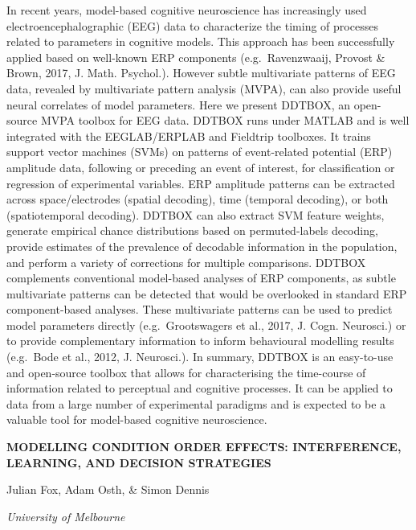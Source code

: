 \documentclass[]{article}
\begin{document}
In recent years, model-based cognitive neuroscience has increasingly
used electroencephalographic (EEG) data to characterize the timing of
processes related to parameters in cognitive models. This approach has
been successfully applied based on well-known ERP components
(e.g.~Ravenzwaaij, Provost \& Brown, 2017, J. Math. Psychol.). However
subtle multivariate patterns of EEG data, revealed by multivariate
pattern analysis (MVPA), can also provide useful neural correlates of
model parameters. Here we present DDTBOX, an open-source MVPA toolbox
for EEG data. DDTBOX runs under MATLAB and is well integrated with the
EEGLAB/ERPLAB and Fieldtrip toolboxes. It trains support vector machines
(SVMs) on patterns of event-related potential (ERP) amplitude data,
following or preceding an event of interest, for classification or
regression of experimental variables. ERP amplitude patterns can be
extracted across space/electrodes (spatial decoding), time (temporal
decoding), or both (spatiotemporal decoding). DDTBOX can also extract
SVM feature weights, generate empirical chance distributions based on
permuted-labels decoding, provide estimates of the prevalence of
decodable information in the population, and perform a variety of
corrections for multiple comparisons. DDTBOX complements conventional
model-based analyses of ERP components, as subtle multivariate patterns
can be detected that would be overlooked in standard ERP component-based
analyses. These multivariate patterns can be used to predict model
parameters directly (e.g.~Grootswagers et al., 2017, J. Cogn. Neurosci.)
or to provide complementary information to inform behavioural modelling
results (e.g.~Bode et al., 2012, J. Neurosci.). In summary, DDTBOX is an
easy-to-use and open-source toolbox that allows for characterising the
time-course of information related to perceptual and cognitive
processes. It can be applied to data from a large number of experimental
paradigms and is expected to be a valuable tool for model-based
cognitive neuroscience.

\textbf{MODELLING CONDITION ORDER EFFECTS: INTERFERENCE, LEARNING, AND
DECISION STRATEGIES}

Julian Fox, Adam Osth, \& Simon Dennis

\emph{University of Melbourne}
\end{document}
